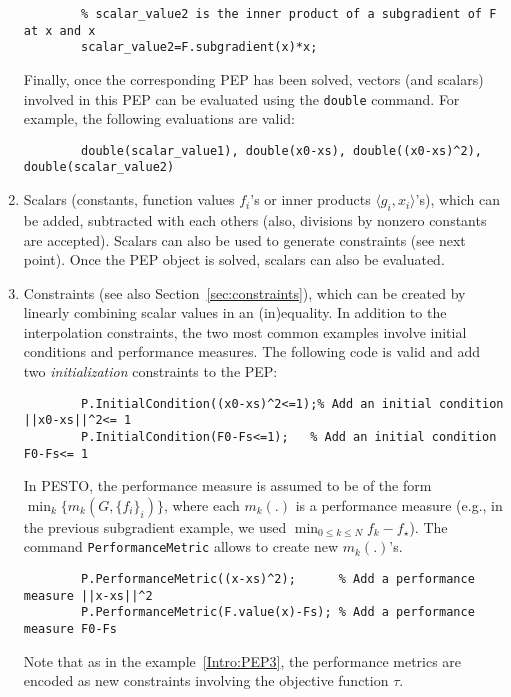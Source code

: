 \documentclass[11pt,a4paper]{article}
\newcommand{\inner}[2]{{\langle #1, #2\rangle}}
\begin{document}
\begin{enumerate}
\begin{lstlisting}
		% scalar_value2 is the inner product of a subgradient of F at x and x
		scalar_value2=F.subgradient(x)*x;
		\end{lstlisting}
		Finally, once the corresponding PEP has been solved, vectors (and scalars) involved in this PEP can be evaluated using the \verb?double? command. For example, the following evaluations are valid:\\[-1cm]
		\begin{lstlisting}
		double(scalar_value1), double(x0-xs), double((x0-xs)^2), double(scalar_value2)
		\end{lstlisting}
		\item Scalars (constants, function values $f_i$'s or inner products $\inner{g_i}{x_i}$'s), which can be added, subtracted with each others (also, divisions by nonzero constants are accepted). Scalars can also be used to generate constraints (see next point). Once the PEP object is solved, scalars can also be evaluated.
		\item Constraints (see also Section~\ref{sec:constraints}), which can be created by linearly combining scalar values in an (in)equality. In addition to the interpolation constraints, the two most common examples involve initial conditions and performance measures. The following code is valid and add two \emph{initialization} constraints to the PEP:\\[-1cm]
		\begin{lstlisting}
		P.InitialCondition((x0-xs)^2<=1);% Add an initial condition ||x0-xs||^2<= 1
		P.InitialCondition(F0-Fs<=1);	% Add an initial condition F0-Fs<= 1
		\end{lstlisting}
		In PESTO, the performance measure is assumed to be of the form $\min_k \{m_k(G,\{f_i\}_i)\}$, where each $m_k(.)$ is a performance measure (e.g., in the previous subgradient example, we used $\min_{0\leq k \leq N} f_k-f_\star$). The command \verb?PerformanceMetric? allows to create new $m_k(.)$'s.\\[-1cm]
		\begin{lstlisting}
		P.PerformanceMetric((x-xs)^2); 		% Add a performance measure ||x-xs||^2
		P.PerformanceMetric(F.value(x)-Fs);	% Add a performance measure F0-Fs
		\end{lstlisting}
		Note that as in the example~\eqref{Intro:PEP3}, the performance metrics are encoded as new constraints involving the objective function $\tau$.
	\end{enumerate}
	\newpage
\end{document}
